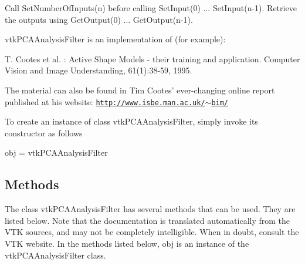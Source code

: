 Call Set\-Number\-Of\-Inputs(n) before calling Set\-Input(0) ... Set\-Input(n-\/1). Retrieve the outputs using Get\-Output(0) ... Get\-Output(n-\/1).

vtk\-P\-C\-A\-Analysis\-Filter is an implementation of (for example)\-:

T. Cootes et al. \-: Active Shape Models -\/ their training and application. Computer Vision and Image Understanding, 61(1)\-:38-\/59, 1995.

The material can also be found in Tim Cootes' ever-\/changing online report published at his website\-: \href{http://www.isbe.man.ac.uk/~bim/}{\tt http\-://www.\-isbe.\-man.\-ac.\-uk/$\sim$bim/}

To create an instance of class vtk\-P\-C\-A\-Analysis\-Filter, simply invoke its constructor as follows \begin{DoxyVerb}  obj = vtkPCAAnalysisFilter
\end{DoxyVerb}
 \hypertarget{vtkwidgets_vtkxyplotwidget_Methods}{}\subsection{Methods}\label{vtkwidgets_vtkxyplotwidget_Methods}
The class vtk\-P\-C\-A\-Analysis\-Filter has several methods that can be used. They are listed below. Note that the documentation is translated automatically from the V\-T\-K sources, and may not be completely intelligible. When in doubt, consult the V\-T\-K website. In the methods listed below, {\ttfamily obj} is an instance of the vtk\-P\-C\-A\-Analysis\-Filter class. 
